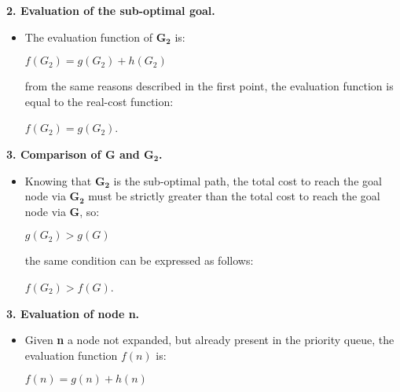 \begin{example}
    \textbf{2. Evaluation of the sub-optimal goal.} 
    \begin{itemize}
        \renewcommand{\labelitemi}{}
        \item \vspace{3.5pt}
        The evaluation function of $\mathbf{G_2}$ is: \vspace{3.5pt}
        \begin{center}
            $f(G_2) = g(G_2) + h(G_2)$
        \end{center} \vspace{3.5pt}

        from the same reasons described in the first point, the evaluation function is equal to the real-cost function: \vspace{3.5pt}
        \begin{center}
            $f(G_2) = g(G_2)$.
        \end{center}
    \end{itemize}

    \textbf{3. Comparison of G and $\mathbf{G_2}$.} 
    \begin{itemize}
        \renewcommand{\labelitemi}{}
        \item \vspace{3.5pt}
        Knowing that $\mathbf{G_2}$ is the sub-optimal path, the total cost to reach the goal node via $\mathbf{G_2}$ must be strictly greater than the total cost to reach the
        goal node via $\textbf{G}$, so: \vspace{3.5pt}
        \begin{center}
            $g(G_2) > g(G)$
        \end{center} \vspace{3.5pt}
        
        the same condition can be expressed as follows:  \vspace{3.5pt}
        \begin{center}
            $f(G_2) > f(G)$.
        \end{center} \vspace{3.5pt}
    \end{itemize}

    \textbf{3. Evaluation of node n.} 
    \begin{itemize}
        \renewcommand{\labelitemi}{}
        \item \vspace{3.5pt}
        Given \textbf{n} a node not expanded, but already present in the priority queue, the evaluation function $f(n)$ is: \vspace{3.5pt}
        \begin{center}
            $f(n) = g(n) + h(n)$
        \end{center} \vspace{3.5pt}


\end{itemize}
\end{example}
